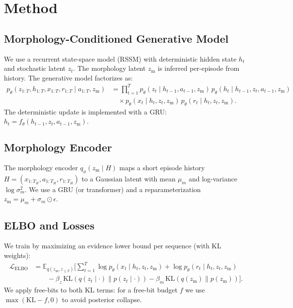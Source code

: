 \documentclass{article}
\begin{document}
\section{Method}
\subsection{Morphology-Conditioned Generative Model}
We use a recurrent state-space model (RSSM) with deterministic hidden state $h_t$ and stochastic latent $z_t$. The morphology latent $z_{\mathrm{m}}$ is inferred per-episode from history. The generative model factorizes as:
\begin{align}
    p_\theta(z_{1:T}, h_{1:T}, x_{1:T}, r_{1:T} \mid a_{1:T}, z_{\mathrm{m}})
    &= \prod_{t=1}^T p_\theta(z_t \mid h_{t-1}, a_{t-1}, z_{\mathrm{m}}) \, p_\theta(h_t \mid h_{t-1}, z_t, a_{t-1}, z_{\mathrm{m}}) \\
    &\quad \times p_\theta(x_t \mid h_t, z_t, z_{\mathrm{m}})\, p_\theta(r_t \mid h_t, z_t, z_{\mathrm{m}}).
\end{align}
The deterministic update is implemented with a GRU: $h_t = f_\theta(h_{t-1}, z_t, a_{t-1}, z_{\mathrm{m}})$.

\subsection{Morphology Encoder}
The morphology encoder $q_\phi(z_{\mathrm{m}} \mid H)$ maps a short episode history $H=(x_{1:T_H},a_{1:T_H},r_{1:T_H})$ to a Gaussian latent with mean $\mu_{m}$ and log-variance $\log\sigma^2_{m}$. We use a GRU (or transformer) and a reparameterization $z_{\mathrm{m}}=\mu_{m}+\sigma_{m}\odot\epsilon$.

\subsection{ELBO and Losses}
We train by maximizing an evidence lower bound per sequence (with KL weights):
\begin{align}
\mathcal{L}_{\mathrm{ELBO}} &= \mathbb{E}_{q(z_{\mathrm{m}}, z_{\le T})} \Big[ \sum_{t=1}^T \log p_\theta(x_t\mid h_t,z_t,z_{\mathrm{m}}) + \log p_\theta(r_t\mid h_t,z_t,z_{\mathrm{m}}) \\
&\qquad - \beta_z\,\mathrm{KL}(q(z_t\mid\cdot)\|p(z_t\mid\cdot)) - \beta_m\,\mathrm{KL}(q(z_{\mathrm{m}})\|p(z_{\mathrm{m}})) \Big].
\end{align}
We apply free-bits to both KL terms: for a free-bit budget $f$ we use $\max(\mathrm{KL}-f,0)$ to avoid posterior collapse.
\end{document}
